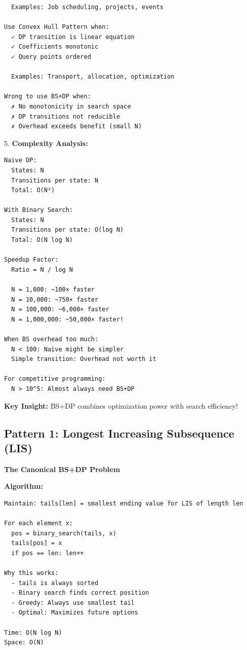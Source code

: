 \documentclass[11pt,a4paper,oneside]{book}
\begin{document}
\begin{tcolorbox}[
    enhanced,breakable,
    colback=white,
    colframe=deepblue,
    boxrule=1.5pt,
    arc=3mm,
    title=\textbf{The BS+DP Synergy}
]
\begin{verbatim}
  Examples: Job scheduling, projects, events

Use Convex Hull Pattern when:
  ✓ DP transition is linear equation
  ✓ Coefficients monotonic
  ✓ Query points ordered
  
  Examples: Transport, allocation, optimization

Wrong to use BS+DP when:
  ✗ No monotonicity in search space
  ✗ DP transitions not reducible
  ✗ Overhead exceeds benefit (small N)
\end{verbatim}

5. \textbf{Complexity Analysis:}
\begin{verbatim}
Naive DP:
  States: N
  Transitions per state: N
  Total: O(N²)

With Binary Search:
  States: N
  Transitions per state: O(log N)
  Total: O(N log N)

Speedup Factor:
  Ratio = N / log N
  
  N = 1,000: ~100× faster
  N = 10,000: ~750× faster
  N = 100,000: ~6,000× faster
  N = 1,000,000: ~50,000× faster!

When BS overhead too much:
  N < 100: Naive might be simpler
  Simple transition: Overhead not worth it
  
For competitive programming:
  N > 10^5: Almost always need BS+DP
\end{verbatim}

\textbf{Key Insight:}
BS+DP combines optimization power with search efficiency!
\end{tcolorbox}

\subsection{Pattern 1: Longest Increasing Subsequence (LIS)}

\begin{tcolorbox}[
    enhanced,breakable,
    colback=successgreen!10,
    colframe=successgreen,
    boxrule=1.5pt,
    arc=3mm,
    title=\textbf{Complete LIS Algorithms}
]
\textbf{The Canonical BS+DP Problem}

\textbf{Algorithm:}
\begin{verbatim}
Maintain: tails[len] = smallest ending value for LIS of length len

For each element x:
  pos = binary_search(tails, x)
  tails[pos] = x
  if pos == len: len++

Why this works:
  - tails is always sorted
  - Binary search finds correct position
  - Greedy: Always use smallest tail
  - Optimal: Maximizes future options

Time: O(N log N)
Space: O(N)
\end{verbatim}
\end{tcolorbox}
\end{document}
